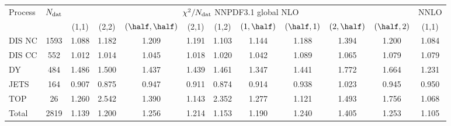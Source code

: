 \begin{center}
\renewcommand*{\arraystretch}{1.7}
\scriptsize
\begin{tabular}{|l|c|ccccccccc|c|}
  \toprule
  Process  
& $N_{\rm dat}$ 
& \multicolumn{9}{c|}{$\chi^2/N_{\rm dat}$ NNPDF3.1 global NLO}  
& NNLO 
 \\
&  
& (1,1) & (2,2) & $(\half,\half)$ & (2,1) & (1,2) & $(1,\half)$ & $(\half,1)$ & $(2,\half)$ & $(\half,2)$   
& (1,1) 
 \\
 \toprule
DIS NC & 1593 & 1.088 & 1.182 & 1.209 & 1.191 & 1.103 & 1.144 & 1.188 & 1.394 & 1.200 & 1.084 \\
DIS CC &  552 & 1.012 & 1.014 & 1.045 & 1.018 & 1.020 & 1.042 & 1.089 & 1.065 & 1.079 & 1.079 \\
\midrule
DY     &  484 & 1.486 & 1.500 & 1.437 & 1.439 & 1.461 & 1.347 & 1.441 & 1.772 & 1.664 & 1.231 \\
JETS   &  164 & 0.907 & 0.875 & 0.947 & 0.911 & 0.874 & 0.914 & 0.938 & 1.023 & 0.945 & 0.950 \\
TOP    &   26 & 1.260 & 2.542 & 1.390 & 1.143 & 2.352 & 1.277 & 1.121 & 1.493 & 1.756 & 1.068 \\
\midrule
Total  & 2819 & 1.139 & 1.200 & 1.256 & 1.214 & 1.153 & 1.190 & 1.240 & 1.405 & 1.253 & 1.105  \\
\bottomrule
\end{tabular}
\end{center}
